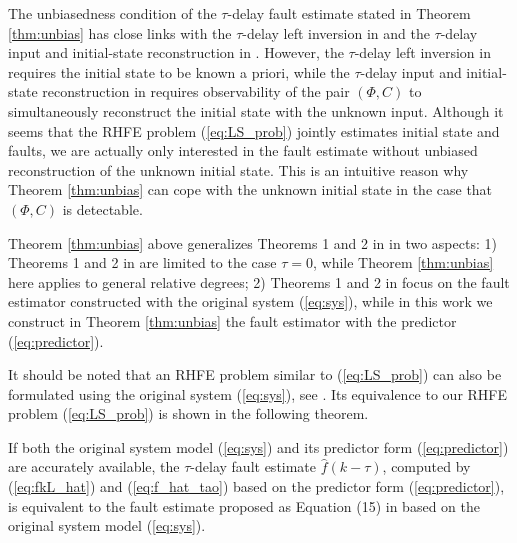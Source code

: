 \documentclass[twocolumn]{autart}
\begin{document}
\begin{rem}
The unbiasedness condition of the $\tau$-delay fault estimate stated in Theorem \ref{thm:unbias} has close links with the $\tau$-delay left inversion in \cite{Massey1968, Gill2007} and the $\tau$-delay input and initial-state reconstruction in \cite{Kirt2011}. However, the $\tau$-delay left inversion in \cite{Massey1968, Gill2007} requires the initial state to be known a priori, while the $\tau$-delay input and initial-state reconstruction in \cite{Kirt2011} requires observability of the pair $\left( \Phi, C \right)$ to simultaneously reconstruct the initial state with the unknown input. Although it seems that the RHFE problem (\ref{eq:LS_prob}) jointly estimates initial state and faults, we are actually only interested in the fault estimate without unbiased reconstruction of the unknown initial state. This is an intuitive reason why Theorem \ref{thm:unbias} can cope with the unknown initial state in the case that $\left( \Phi, C \right)$ is detectable.
\end{rem}

\begin{rem}
Theorem \ref{thm:unbias} above generalizes Theorems 1 and 2 in \cite{Wan2014} in two aspects: 1) Theorems 1 and 2 in \cite{Wan2014} are limited to the case $\tau=0$, while Theorem \ref{thm:unbias} here applies to general relative degrees; 2) Theorems 1 and 2 in \cite{Wan2014} focus on the fault estimator constructed with the original system (\ref{eq:sys}), while in this work we construct in Theorem \ref{thm:unbias} the fault estimator with the predictor (\ref{eq:predictor}).
\end{rem}


It should be noted that an RHFE problem similar to (\ref{eq:LS_prob}) can also be formulated using the original system (\ref{eq:sys}), see \cite{Wan2014}. Its equivalence to our RHFE problem (\ref{eq:LS_prob}) is shown in the following theorem.


\begin{thm}\label{thm:solution_equivalent}
If both the original system model (\ref{eq:sys}) and its predictor form (\ref{eq:predictor}) are accurately available, the $\tau$-delay fault estimate $\hat f(k-\tau)$, computed by (\ref{eq:fkL_hat}) and (\ref{eq:f_hat_tao}) based on the predictor form (\ref{eq:predictor}), is equivalent to the fault estimate proposed as Equation (15) in \cite{Wan2014} based on the original system model (\ref{eq:sys}).
\end{thm}
\end{document}
